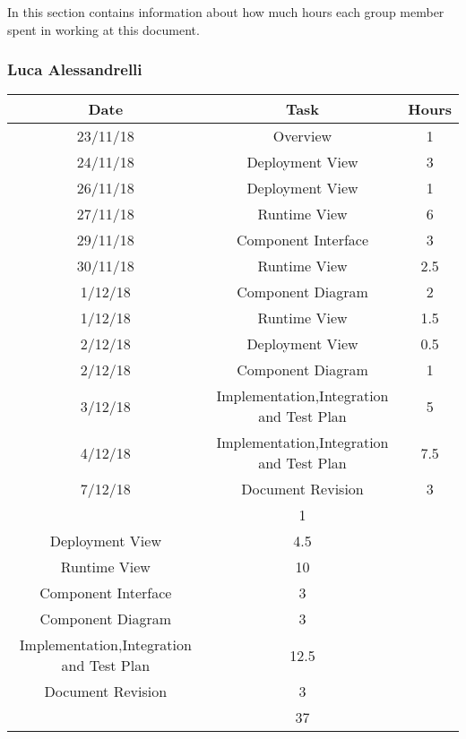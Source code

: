 In this section contains information about how much hours each group member spent in working at this document.
\bigbreak

\subsubsection{Luca Alessandrelli}
\begin{table}[h]
\centering
\begin{tabular}{|c|c|c|}
\hline
\rowcolor[HTML]{FE996B} 
Date & Task & Hours 
\\ \hline
\rowcolor[HTML]{FFFC9E} 
23/11/18  & Overview & 1  
\\ \hline
\rowcolor[HTML]{FFFC9E} 
24/11/18 & Deployment View & 3  
\\ \hline
\rowcolor[HTML]{FFFC9E}
26/11/18 & Deployment View & 1 
\\ \hline
\rowcolor[HTML]{FFFC9E}
27/11/18 & Runtime View & 6 
\\ \hline
\rowcolor[HTML]{FFFC9E}
29/11/18 & Component Interface & 3
\\ \hline
\rowcolor[HTML]{FFFC9E}
30/11/18 & Runtime View & 2.5
\\ \hline
\rowcolor[HTML]{FFFC9E}
1/12/18 & Component Diagram & 2 
\\ \hline
\rowcolor[HTML]{FFFC9E}
1/12/18 & Runtime View & 1.5
\\ \hline
\rowcolor[HTML]{FFFC9E}
2/12/18 & Deployment View & 0.5
\\ \hline
\rowcolor[HTML]{FFFC9E}
2/12/18 & Component Diagram & 1 
\\ \hline
\rowcolor[HTML]{FFFC9E}
3/12/18 & Implementation,Integration and Test Plan & 5
\\ \hline
\rowcolor[HTML]{FFFC9E}
4/12/18 & Implementation,Integration and Test Plan & 7.5
\\ \hline
\rowcolor[HTML]{FFFC9E}
7/12/18 & Document Revision & 3
\\ \hline

\rowcolor[HTML]{FFCE93} 
\multicolumn{2}{|c|}{Overview} & 1 \\ 
\hline
\rowcolor[HTML]{FFCE93} 
\multicolumn{2}{|c|} {Deployment View} & 4.5 \\
\hline
\rowcolor[HTML]{FFCE93} 
\multicolumn{2}{|c|} {Runtime View} & 10 \\
\hline
\rowcolor[HTML]{FFCE93} 
\multicolumn{2}{|c|} {Component Interface} & 3 \\
\hline
\rowcolor[HTML]{FFCE93} 
\multicolumn{2}{|c|} {Component Diagram} & 3 \\
\hline
\rowcolor[HTML]{FFCE93} 
\multicolumn{2}{|c|} {Implementation,Integration and Test Plan} & 12.5 \\
\hline
\rowcolor[HTML]{FFCE93} 
\multicolumn{2}{|c|} {Document Revision} & 3 \\
\hline



\rowcolor[HTML]{FE996B} 
\multicolumn{2}{|c|}{\cellcolor[HTML]{FE996B}Total} & \cellcolor[HTML]{FFFC9E}37 \\ \hline
\end{tabular}
\end{table}

